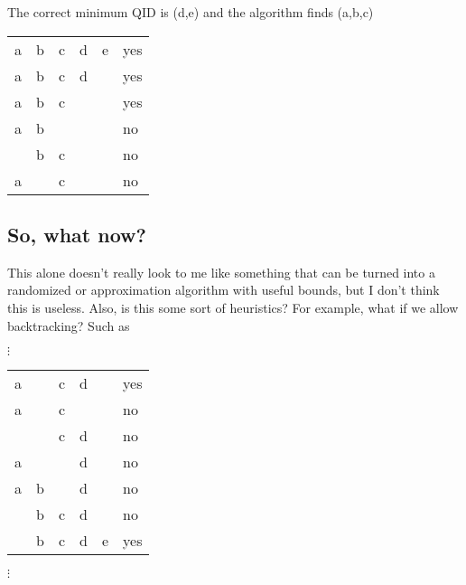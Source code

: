 \documentclass[12pt]{article}
\begin{document}
The correct minimum QID is (d,e) and the algorithm finds (a,b,c)
\begin{center}
    \begin{tabular}{ | M{3em} | M{3em} | M{3em} | M{3em} | M{3em} | M{3em} | }
    \hline
    a & b & c & d & e & yes\\
    a & b & c & d &   & yes\\
    a & b & c &   &   & yes\\
    a & b &   &   &   & no\\
      & b & c &   &   & no\\
    a &   & c &   &   & no\\
    \hline
    \end{tabular}
\end{center}

\subsection*{So, what now?}
This alone doesn't really look to me like something that can be turned into a randomized or approximation algorithm with useful bounds, but I don't think this is useless. Also, is this some sort of heuristics? For example, what if we allow backtracking? Such as
\begin{center}
    $\vdots$

    \begin{tabular}{ | M{3em} | M{3em} | M{3em} | M{3em} | M{3em} | M{3em} | }
    a &   & c & d &   & yes\\
    a &   & c &   &   & no\\
      &   & c & d &   & no\\
    a &   &   & d &   & no\\
    a & b &   & d &   & no\\
      & b & c & d &   & no\\
      & b & c & d & e & yes\\
    \end{tabular}

    $\vdots$
\end{center}
\end{document}
